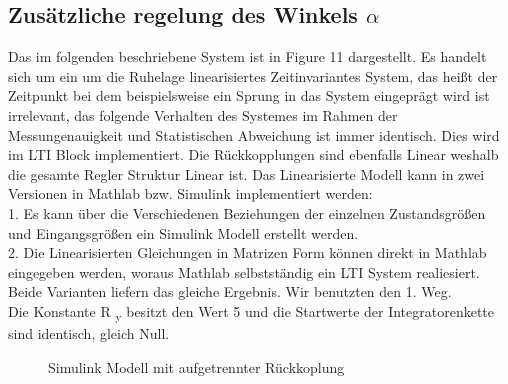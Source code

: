 \documentclass[10pt]{scrartcl}
\begin{document}
\subsection{Zusätzliche regelung des Winkels $\alpha$ }
Das im folgenden beschriebene System ist in Figure 11 dargestellt. 
Es handelt sich um ein um die Ruhelage linearisiertes Zeitinvariantes System, das heißt der Zeitpunkt bei dem beispielsweise ein Sprung in das System eingeprägt wird ist irrelevant, das folgende Verhalten des Systemes im Rahmen der Messungenauigkeit und Statistischen Abweichung ist immer identisch. Dies wird im LTI Block implementiert. Die Rückkopplungen sind ebenfalls Linear weshalb die gesamte Regler Struktur Linear ist.
Das Linearisierte Modell kann in zwei Versionen in Mathlab bzw. Simulink implementiert werden:\\
1. Es kann über die Verschiedenen Beziehungen der einzelnen Zustandsgrößen und Eingangsgrößen ein Simulink Modell erstellt werden.\\
2. Die Linearisierten Gleichungen in Matrizen Form können direkt in Mathlab eingegeben werden, woraus Mathlab selbstständig ein LTI System realiesiert. \\
Beide Varianten liefern das gleiche Ergebnis.
Wir benutzten den 1. Weg. \\
Die Konstante R \textsubscript{y} besitzt den Wert 5 und die Startwerte der Integratorenkette sind identisch, gleich Null.\\
\begin{figure} [H]
\caption{Simulink Modell mit aufgetrennter Rückkoplung} 
\end{figure}
\end{document}
